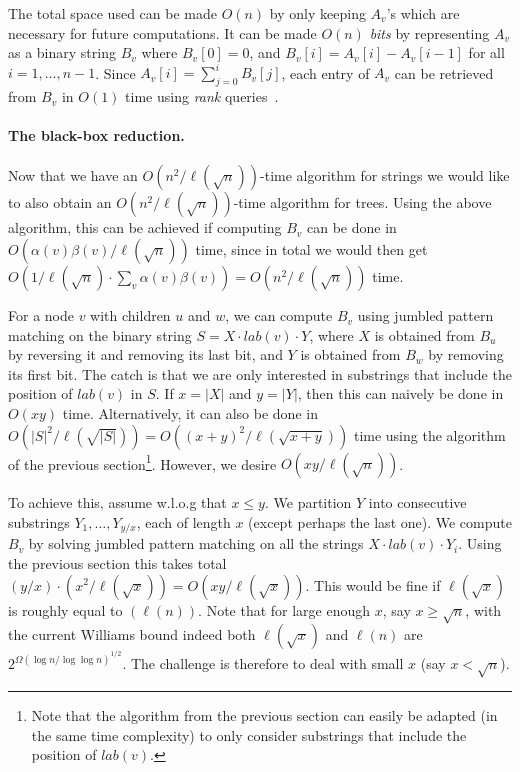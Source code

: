 \documentclass[11pt]{llncs}
\begin{document}
The total space used can be made $O(n)$ by only keeping $A_v$'s which are necessary for future computations. It can be made $O(n)$ {\em bits} by representing $A_v$ as a binary string $B_v$ where $B_v[0]=0$, and $B_v[i]= A_v[i]-A_v[i-1]$ for all $i=1,\ldots,n-1$. Since $A_v[i]= \sum_{j=0}^i B_v[j]$, each entry of $A_v$ can be retrieved from $B_v$ in $O(1)$ time using {\em rank} queries~\cite{Jacobson}.

\paragraph{\bf The black-box reduction.}

Now that we have an $O(n^2/\ell(\sqrt{n}))$-time algorithm for  strings we would like to also obtain an $O(n^2/\ell(\sqrt{n}))$-time algorithm for trees. Using the above algorithm, this can be achieved if computing $B_v$ can be done in $O(\alpha(v)\beta(v)/\ell(\sqrt{n}))$ time, since in total we would then get $O(1/\ell(\sqrt{n}) \cdot \sum_v \alpha(v)\beta(v)) = O(n^2/\ell(\sqrt{n}))$ time.

For a node $v$ with children $u$ and $w$, we can compute $B_v$ using jumbled pattern matching on the binary string $S = X \cdot lab(v) \cdot Y$, where $X$ is obtained from $B_u$ by reversing it and removing its last bit, and $Y$ is obtained from $B_w$ by removing its first bit. The catch is that we are only interested in substrings that include the position of $lab(v)$ in $S$. If $x=|X|$ and $y=|Y|$, then this can naively be done in $O(xy)$ time. Alternatively, it can also be done in $O(|S|^2/\ell(\sqrt{|S|}))= O((x+y)^2/\ell(\sqrt{x+y}))$ time using the algorithm of the previous section\footnote{Note that the algorithm from the previous section can easily be adapted (in the same time complexity) to only consider substrings that include the position of $lab(v)$.}. However, we desire $O(xy/\ell(\sqrt{n}))$.

To achieve this, assume w.l.o.g that $x \leq y$. We partition $Y$ into consecutive substrings $Y_1,\ldots,Y_{y/x}$, each of length $x$ (except perhaps the last one). We compute $B_v$ by solving jumbled pattern matching on all the strings  $X \cdot lab(v) \cdot Y_i$. Using the previous section this takes total $(y/x)\cdot (x^2/\ell(\sqrt{x}))= O(xy/\ell(\sqrt{x}))$. This would be fine if $\ell(\sqrt{x})$ is roughly equal to $(\ell(n))$. Note that for large enough $x$, say $x\!\ge\!\! \sqrt{n}$, with the current Williams bound  indeed both $\ell(\sqrt{x})$ and $\ell(n)$ are $2^{\Omega(\log n/\log \log n)^{1/2}}$.  The challenge is therefore  to deal with small $x$ (say $x\!< \!\sqrt{n}$).
\end{document}
